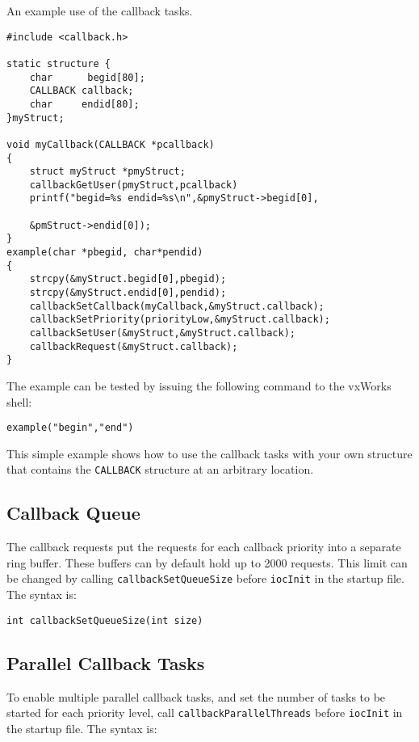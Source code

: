 An example use of the callback tasks.

\begin{verbatim}
#include <callback.h>

static structure {
    char      begid[80];
    CALLBACK callback;
    char     endid[80];
}myStruct;

void myCallback(CALLBACK *pcallback)
{
    struct myStruct *pmyStruct;
    callbackGetUser(pmyStruct,pcallback)
    printf("begid=%s endid=%s\n",&pmyStruct->begid[0],

    &pmStruct->endid[0]);
}
example(char *pbegid, char*pendid)
{
    strcpy(&myStruct.begid[0],pbegid);
    strcpy(&myStruct.endid[0],pendid);
    callbackSetCallback(myCallback,&myStruct.callback);
    callbackSetPriority(priorityLow,&myStruct.callback);
    callbackSetUser(&myStruct,&myStruct.callback);
    callbackRequest(&myStruct.callback);
}
\end{verbatim}

The example can be tested by issuing the following command to the vxWorks shell:

\begin{verbatim}
example("begin","end")
\end{verbatim}

This simple example shows how to use the callback tasks with your own structure that contains the \verb|CALLBACK| structure 
at an arbitrary location.

\subsection{Callback Queue}

The callback requests put the requests for each callback priority into a separate ring buffer. These buffers can by default 
hold up to 2000 requests. This limit can be changed by calling \verb|callbackSetQueueSize| before \verb|iocInit| in the 
startup file. The syntax is:

\begin{verbatim}
int callbackSetQueueSize(int size)
\end{verbatim}

\subsection{Parallel Callback Tasks}
\label{Parallel Callback Tasks}

To enable multiple parallel callback tasks, and set the number of tasks to be started for each priority level, call
\verb|callbackParallelThreads| before \verb|iocInit| in the startup file. The syntax is:

